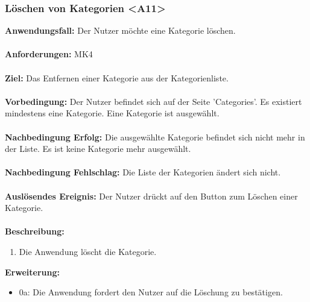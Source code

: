 \documentclass[parskip=full]{scrartcl} %
\begin{document}
\subsubsection*{Löschen von Kategorien <A11>}
\textbf{Anwendungsfall:} Der Nutzer möchte eine Kategorie löschen.\\\\
\textbf{Anforderungen:} MK4\\\\
\textbf{Ziel:} Das Entfernen einer Kategorie aus der Kategorienliste.\\\\
\textbf{Vorbedingung:} Der Nutzer befindet sich auf der Seite 'Categories'. Es existiert mindestens eine Kategorie. Eine Kategorie ist ausgewählt.\\\\
\textbf{Nachbedingung Erfolg:} Die ausgewählte Kategorie befindet sich nicht mehr in der Liste. Es ist keine Kategorie mehr ausgewählt.\\\\
\textbf{Nachbedingung Fehlschlag:} Die Liste der Kategorien ändert sich nicht.\\\\
\textbf{Auslösendes Ereignis:} Der Nutzer drückt auf den Button zum Löschen einer Kategorie. \\\\
\textbf{Beschreibung:}
\begin{enumerate}
    \item Die Anwendung löscht die Kategorie.
\end{enumerate}
\textbf{Erweiterung:}
\begin{itemize}
    \item 0a: Die Anwendung fordert den Nutzer auf die Löschung zu bestätigen.
\end{itemize}
\newpage
\end{document}
